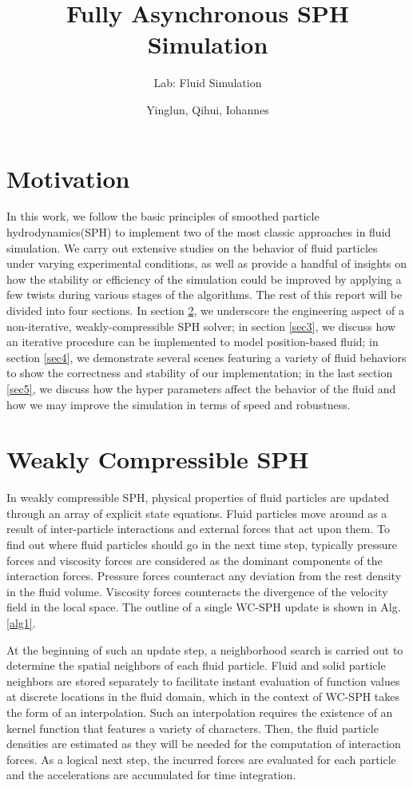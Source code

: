 \documentclass[
	11pt, 
	DIV10,
	ngerman,
	a4paper, 
	oneside, 
	headings=normal, 
	captions=tableheading,
	final, 
	numbers=noenddot
]{scrartcl}
\title{Fully Asynchronous SPH Simulation}
\subtitle{\vspace{0.5cm}Lab: Fluid Simulation}
\author{Yinglun, Qihui, Iohannes}
\begin{document}
\maketitle


\section{Motivation}

In this work, we follow the basic principles of smoothed particle hydrodynamics(SPH) to implement two of the most classic approaches in fluid simulation. We carry out extensive studies on the behavior of fluid particles under varying experimental conditions, as well as provide a handful of insights on how the stability or efficiency of the simulation could be improved by applying a few twists during various stages of the algorithms. The rest of this report will be divided into four sections. In section \ref{sec2}, we underscore the engineering aspect of a non-iterative, weakly-compressible SPH solver; in section \ref{sec3}, we discuss how an iterative procedure can be implemented to model position-based fluid; in section \ref{sec4}, we demonstrate several scenes featuring a variety of fluid behaviors to show the correctness and stability of our implementation; in the last section \ref{sec5}, we discuss how the hyper parameters affect the behavior of the fluid and how we may improve the simulation in terms of speed and robustness.


\section{Weakly Compressible SPH}
\label{sec2}

In weakly compressible SPH, physical properties of fluid particles are updated through an array of explicit state equations. Fluid particles move around as a result of inter-particle interactions and external forces that act upon them. To find out where fluid particles should go in the next time step, typically pressure forces and viscosity forces are considered as the dominant components of the interaction forces. Pressure forces counteract any deviation from the rest density in the fluid volume. Viscosity forces counteracts the divergence of the velocity field in the local space. The outline of a single WC-SPH update is shown in Alg. \ref{alg1}.

At the beginning of such an update step, a neighborhood search is carried out to determine the spatial neighbors of each fluid particle. Fluid and solid particle neighbors are stored separately to facilitate instant evaluation of function values at discrete locations in the fluid domain, which in the context of WC-SPH takes the form of an interpolation. Such an interpolation requires the existence of an kernel function that features a variety of characters. Then, the fluid particle densities are estimated as they will be needed for the computation of interaction forces. As a logical next step, the incurred forces are evaluated for each particle and the accelerations are accumulated for time integration.
\end{document}
